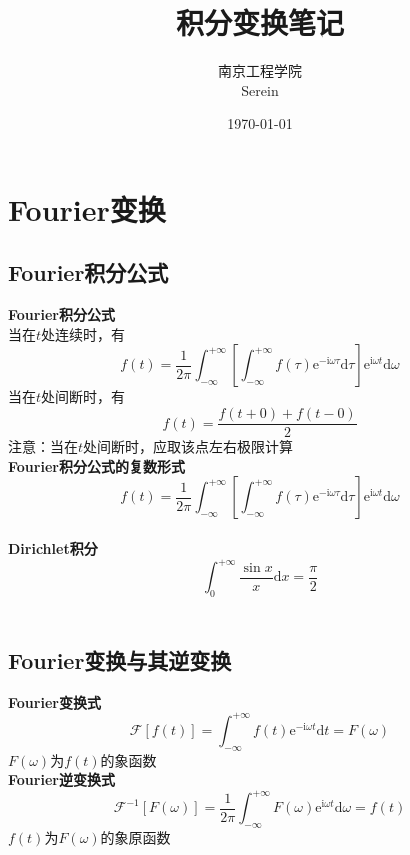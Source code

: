 \documentclass[12pt, a4paper, twoside]{ctexbook}
\title{{\Huge{\textbf{积分变换笔记}}}}
\author{南京工程学院\\Serein}
\date{\today}
\begin{document}
\maketitle

\setcounter{page}{1}

\newpage
{}
\setcounter{page}{1}
\tableofcontents
\newpage
\setcounter{page}{1}

\chapter{Fourier变换}
\newpage

\section{Fourier积分公式}

\textbf{Fourier积分公式}\\
当在$t$处连续时，有
$$
f \left( t \right) = \frac{1}{2\pi} \int_{-\infty}^{+\infty}{ \left[ \int_{-\infty}^{+\infty}{f \left(\tau \right) \mathrm{e}^{-\mathrm{i}\omega\tau}\mathrm{d} \tau} \right] \mathrm{e}^{\mathrm{i}\omega t}\mathrm{d}\omega}
$$
当在$t$处间断时，有
$$
f \left( t \right) = \frac{f\left( t+0 \right)+f\left(t-0\right)}{2}
$$
注意：当在$t$处间断时，应取该点左右极限计算
~\\

\textbf{Fourier积分公式的复数形式}
$$
f \left( t \right) = \frac{1}{2\pi} \int_{-\infty}^{+\infty}{ \left[ \int_{-\infty}^{+\infty}{f \left(\tau \right) \mathrm{e}^{-\mathrm{i}\omega\tau}\mathrm{d} \tau} \right] \mathrm{e}^{\mathrm{i}\omega t}\mathrm{d}\omega}
$$
~\\

\textbf{Dirichlet积分}
$$
\int_0^{+\infty}{\frac{\sin x}{x}\text{d}x}=\frac{\pi}{2}
$$
~\\

\section{Fourier变换与其逆变换}
\textbf{Fourier变换式}
$$
\mathscr{F}\left[ f\left( t \right) \right] =\int_{-\infty}^{+\infty}{f\left( t \right) \text{e}^{-\text{i}\omega t}\text{d}t}=F\left( \omega \right) 
$$
$F\left(\omega\right)$为$f\left(t\right)$的象函数
~\\

\textbf{Fourier逆变换式}
$$
\mathscr{F}^{-1}\left[ F\left( \omega \right) \right] =\frac{1}{2\pi}\int_{-\infty}^{+\infty}{F\left( \omega \right) \text{e}^{\text{i}\omega t}\text{d}\omega}=f\left(t\right)
$$
$f\left(t\right)$为$F\left(\omega\right)$的象原函数
~\\
\end{document}

